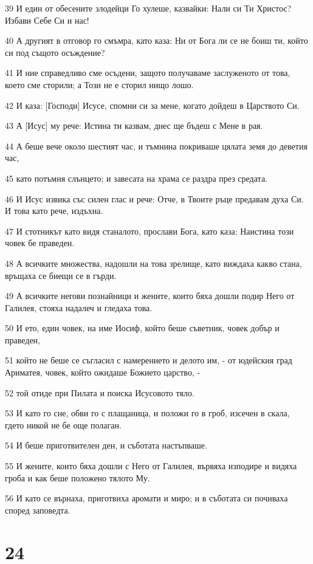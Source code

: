 \par 39 И един от обесените злодейци Го хулеше, казвайки: Нали си Ти Христос? Избави Себе Си и нас!
\par 40 А другият в отговор го смъмра, като каза: Ни от Бога ли се не боиш ти, който си под същото осъждение?
\par 41 И ние справедливо сме осъдени, защото получаваме заслуженото от това, което сме сторили; а Този не е сторил нищо лошо.
\par 42 И каза: [Господи] Исусе, спомни си за мене, когато дойдеш в Царството Си.
\par 43 А [Исус] му рече: Истина ти казвам, днес ще бъдеш с Мене в рая.
\par 44 А беше вече около шестият час, и тъмнина покриваше цялата земя до деветия час,
\par 45 като потъмня слънцето; и завесата на храма се раздра през средата.
\par 46 И Исус извика със силен глас и рече: Отче, в Твоите ръце предавам духа Си. И това като рече, издъхна.
\par 47 И стотникът като видя станалото, прослави Бога, като каза: Наистина този човек бе праведен.
\par 48 А всичките множества, надошли на това зрелище, като виждаха какво стана, връщаха се биещи се в гърди.
\par 49 А всичките негови познайници и жените, които бяха дошли подир Него от Галилея, стояха надалеч и гледаха това.
\par 50 И ето, един човек, на име Иосиф, който беше съветник, човек добър и праведен,
\par 51 който не беше се съгласил с намерението и делото им, - от юдейския град Ариматея, човек, който ожидаше Божието царство, -
\par 52 той отиде при Пилата и поиска Исусовото тяло.
\par 53 И като го сне, обви го с плащаница, и положи го в гроб, изсечен в скала, гдето никой не бе още полаган.
\par 54 И беше приготвителен ден, и съботата настъпваше.
\par 55 И жените, които бяха дошли с Него от Галилея, вървяха изподире и видяха гроба и как беше положено тялото Му.
\par 56 И като се върнаха, приготвиха аромати и миро; и в съботата си почиваха според заповедта.

\chapter{24}

